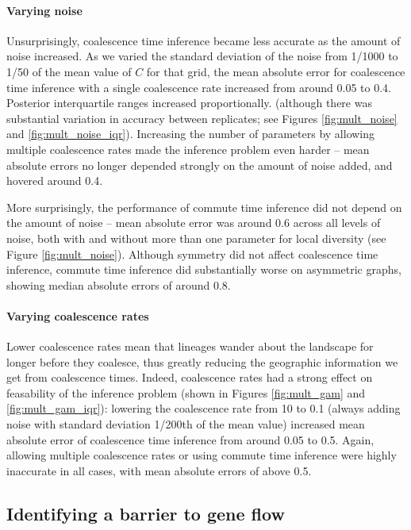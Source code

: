 \documentclass{article}
\begin{document}
\paragraph{Varying noise}
Unsurprisingly, coalescence time inference became less accurate as the amount of noise increased.
As we varied the standard deviation of the noise
from 1/1000 to 1/50 of the mean value of $C$ for that grid,
the mean absolute error 
for coalescence time inference with a single coalescence rate
increased from around 0.05 to 0.4.
Posterior interquartile ranges increased proportionally.
(although there was substantial variation in accuracy between replicates;
see Figures \ref{fig:mult_noise} and \ref{fig:mult_noise_iqr}).
Increasing the number of parameters by allowing multiple coalescence rates
made the inference problem even harder --
mean absolute errors no longer depended strongly on the amount of noise added,
and hovered around 0.4.

More surprisingly, the performance of commute time inference did not depend on the amount of noise --
mean absolute error was around 0.6 across all levels of noise,
both with and without more than one parameter for local diversity
(see Figure \ref{fig:mult_noise}).
Although symmetry did not affect coalescence time inference,
commute time inference did substantially worse on asymmetric graphs,
showing median absolute errors of around 0.8.

\paragraph{Varying coalescence rates}
Lower coalescence rates mean that lineages wander about the landscape for longer
before they coalesce, 
thus greatly reducing the geographic information we get from coalescence times.
Indeed, coalescence rates had a strong effect on feasability of the inference problem
(shown in Figures \ref{fig:mult_gam} and \ref{fig:mult_gam_iqr}):
lowering the coalescence rate from 10 to 0.1
(always adding noise with standard deviation 1/200th of the mean value)
increased mean absolute error of coalescence time inference from around 0.05 to 0.5.
Again, allowing multiple coalescence rates
or using commute time inference were highly inaccurate in all cases,
with mean absolute errors of above 0.5.


\subsection*{Identifying a barrier to gene flow}
\label{sec:5x3b}
\end{document}
